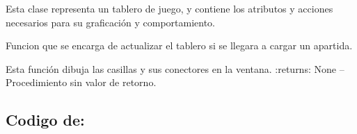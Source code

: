 \documentclass[letterpaper,10pt,english]{sphinxmanual}
\begin{document}

\begin{fulllineitems}
\label{\detokenize{codigo:tablero.VistaTablero}}
Esta clase representa un tablero de juego, y contiene los
atributos y acciones necesarios para su graficación y comportamiento.

\begin{fulllineitems}
\label{\detokenize{codigo:tablero.VistaTablero.actualizar}}
Funcion que se encarga de actualizar el tablero si se llegara a cargar un apartida.

\end{fulllineitems}


\begin{fulllineitems}
\label{\detokenize{codigo:tablero.VistaTablero.dibujarCasillas}}
Esta función dibuja las casillas y sus conectores en la ventana.
:returns:  None -- Procedimiento sin valor de retorno.

\end{fulllineitems}


\end{fulllineitems}



\subsection{Codigo de: }
\label{\detokenize{codigo:module-vista}}\label{\detokenize{codigo:codigo-de-vista}}
\end{document}
